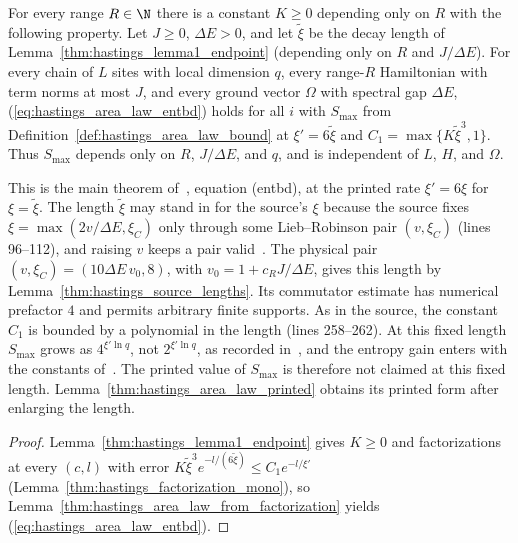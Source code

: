 \begin{lemma}
    \label{thm:hastings_area_law}
    \leanok
    For every range $R\in\N$ there is a constant $K\ge0$ depending only on $R$
    with the following property. Let $J\ge0$, $\Delta E>0$, and let $\tilde\xi$
    be the decay length of Lemma~\ref{thm:hastings_lemma1_endpoint}
    (depending only on $R$ and $J/\Delta E$). For every chain of $L$ sites with
    local dimension $q$, every range-$R$ Hamiltonian with term norms at most
    $J$, and every ground vector $\Omega$ with spectral gap $\Delta E$,
    (\ref{eq:hastings_area_law_entbd}) holds for all $i$ with $S_{\max}$ from
    Definition~\ref{def:hastings_area_law_bound} at $\xi'=6\tilde\xi$ and
    $C_1=\max\{K\tilde\xi^3,1\}$. Thus $S_{\max}$ depends only on $R$,
    $J/\Delta E$, and $q$, and is independent of $L$, $H$, and $\Omega$.

    This is the main theorem of~\cite{Hastings2007AreaLaw}, equation (entbd),
    at the printed rate $\xi'=6\xi$ for $\xi=\tilde\xi$. The length
    $\tilde\xi$ may stand in for the source's $\xi$ because the source fixes
    $\xi=\max(2v/\Delta E,\xi_C)$ only through some Lieb--Robinson pair
    $(v,\xi_C)$ (lines 96--112), and raising $v$ keeps a pair
    valid~\cite{gap:hastings07_lemma1_decay_length}. The physical pair
    $(v,\xi_C)=(10\Delta E\,v_0,8)$, with
    $v_0=1+c_RJ/\Delta E$, gives this length by
    Lemma~\ref{thm:hastings_source_lengths}. Its commutator estimate has
    numerical prefactor $4$ and permits arbitrary finite supports.
    As in the source, the constant $C_1$ is bounded by a polynomial in
    the length (lines 258--262). At this fixed length $S_{\max}$
    grows as $4^{\xi'\ln q}$, not $2^{\xi'\ln q}$, as recorded
    in~\cite{gap:hastings07_doubling_constants}, and the entropy gain enters
    with the constants of~\cite{gap:hastings07_relent_constants}. The printed
    value of $S_{\max}$ is therefore not claimed at this fixed length.
    Lemma~\ref{thm:hastings_area_law_printed} obtains its printed form
    after enlarging the length.
\end{lemma}
\begin{proof}\leanok
    Lemma~\ref{thm:hastings_lemma1_endpoint} gives $K\ge0$ and factorizations
    at every $(c,l)$ with error $K\tilde\xi^3e^{-l/(6\tilde\xi)}\le C_1e^{-l/\xi'}$
    (Lemma~\ref{thm:hastings_factorization_mono}), so
    Lemma~\ref{thm:hastings_area_law_from_factorization} yields
    (\ref{eq:hastings_area_law_entbd}).
\end{proof}

